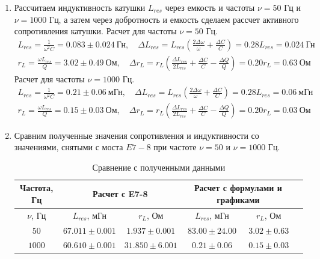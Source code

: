\documentclass[a4paper, 12pt]{article}
\begin{document}
\begin{enumerate}
    \item Рассчитаем индуктивность катушки $L_{res}$ через емкость и частоты $\nu = 50$ Гц и $\nu = 1000$ Гц, а затем через добротность и емкость сделаем рассчет активного
    сопротивления катушки. Расчет для частоты $\nu = 50$ Гц.
    \begin{align}
        L_{res} = \frac{1}{\omega^{2}C} = 0.083\pm 0.024\ \text{Гн}, \quad
        \Delta L_{res} = L_{res}\left(\frac{2\Delta \omega}{\omega} + \frac{\Delta C}{C}\right) = 0.28L_{res} = 0.024\ \text{Гн}\\
        r_L = \frac{\omega L_{res}}{Q} = 3.02\pm 0.49\ \text{Ом}, \quad
        \Delta r_L = r_L\left(\frac{\Delta L_{res}}{2L_{res}} + \frac{\Delta C}{C} - \frac{\Delta Q}{Q}\right) = 0.20r_{L} = 0.63\ \text{Ом}
    \end{align}
    Расчет для частоты $\nu = 1000$ Гц.
    \begin{align}
        L_{res} = \frac{1}{\omega^{2}C} = 0.21\pm 0.06\ \text{мГн}, \quad
        \Delta L_{res} = L_{res}\left(\frac{2\Delta \omega}{\omega} + \frac{\Delta C}{C}\right) = 0.28L_{res} = 0.06\ \text{мГн}\\
        r_L = \frac{\omega L_{res}}{Q} = 0.15\pm 0.03\ \text{Ом},\quad
        \Delta r_L = r_L\left(\frac{\Delta L_{res}}{2L_{res}} + \frac{\Delta C}{C} - \frac{\Delta Q}{Q}\right) = 0.20r_{L} = 0.03\ \text{Ом}
    \end{align}
    \item Сравним полученные значения сопротивления и индуктивности со значениями, снятыми с моста $E7-8$ при частоте $\nu = 50$ и $\nu = 1000$ Гц.
    \begin{table}[htbp]
        \centering
        \begin{tabular}{|c|c|c|c|c|c}
            \hline
            Частота, Гц & \multicolumn{2}{|c|}{Расчет с E7-8} & \multicolumn{2}{|c|}{Расчет с формулами и графиками}\\
            \hline
            $\nu$, Гц & $L_{res}$, мГн & $r_{L}$, Ом &  $L_{res}$, мГн & $r_{L}$, Ом\\
            \hline
            $50$ & $67.011\pm 0.001$ & $1.937\pm 0.001$ & $83.00\pm 24.00$ & $3.02\pm 0.63$\\
            $1000$ & $60.610\pm 0.001$ & $31.850\pm 6.001$ & $0.21\pm 0.06$ & $0.15\pm 0.03$\\
            \hline
        \end{tabular}
        \caption{Сравнение с полученными данными}
        \label{Сравнение с полученными данными}
    \end{table}

\end{enumerate}
\end{document}
